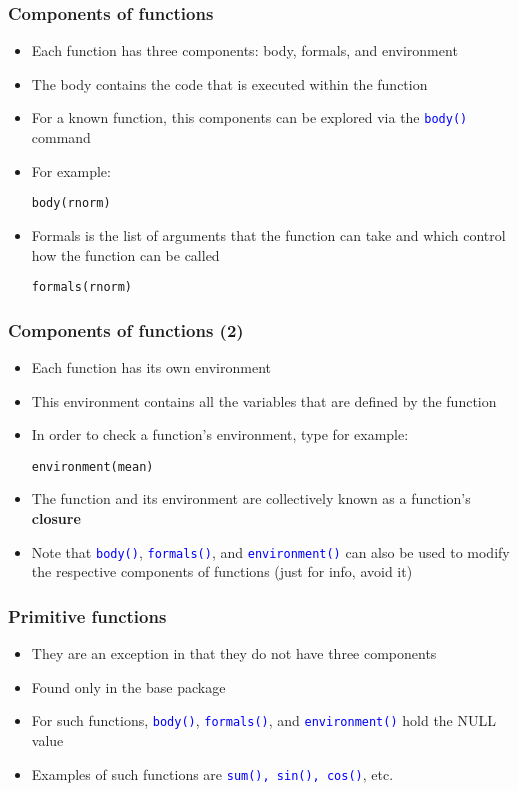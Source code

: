 \documentclass[10pt]{beamer}
\newcommand{\cc}[1]{\texttt{\textcolor{blue}{#1}}}
\theoremstyle{definition}
\begin{document}
\begin{frame}[fragile]
\frametitle{Components of functions}
\begin{itemize}
	\item Each function has three components: body, formals, and environment
	\item The body contains the code that is executed within the function
	\item For a known function, this components can be explored via the \cc{body()} command
	\item For example:
	\begin{lstlisting}[style = rstyle, breaklines]
	body(rnorm)
	\end{lstlisting}
	\item Formals is the list of arguments that the function can take and which control how the function can be called
	\begin{lstlisting}[style = rstyle, breaklines]
	formals(rnorm)
	\end{lstlisting}
\end{itemize}
\end{frame}

\begin{frame}[fragile]
\frametitle{Components of functions (2)}
\begin{itemize}
	\item Each function has its own environment
	\item This environment contains all the variables that are defined by the function
	\item In order to check a function's environment, type for example:
	\begin{lstlisting}[style = rstyle, breaklines]
	environment(mean)
	\end{lstlisting}
	\item The function and its environment are collectively known as a function's \textbf{closure}
	\item Note that \cc{body()}, \cc{formals()}, and \cc{environment()} can also be used to modify the respective components of functions (just for info, avoid it)
\end{itemize}
\end{frame}

\begin{frame}[fragile]
\frametitle{Primitive functions}
\begin{itemize}
	\item They are an exception in that they do not have three components
	\item Found only in the base package
	\item For such functions, \cc{body()}, \cc{formals()}, and \cc{environment()} hold the NULL value
	\item Examples of such functions are \cc{sum(), sin(), cos()}, etc.
\end{itemize}
\end{frame}
\end{document}
